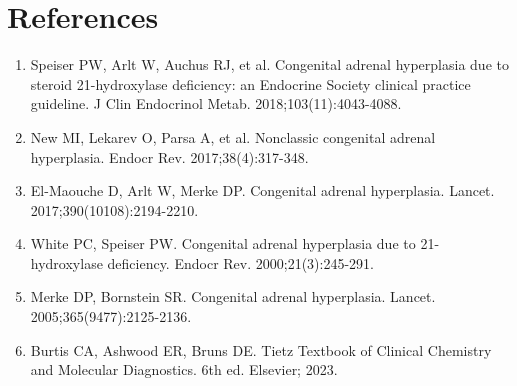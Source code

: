 \section*{References}
\begin{enumerate}
  \item Speiser PW, Arlt W, Auchus RJ, et al. Congenital adrenal hyperplasia due to steroid 21-hydroxylase deficiency: an Endocrine Society clinical practice guideline. J Clin Endocrinol Metab. 2018;103(11):4043-4088.
  \item New MI, Lekarev O, Parsa A, et al. Nonclassic congenital adrenal hyperplasia. Endocr Rev. 2017;38(4):317-348.
  \item El-Maouche D, Arlt W, Merke DP. Congenital adrenal hyperplasia. Lancet. 2017;390(10108):2194-2210.
  \item White PC, Speiser PW. Congenital adrenal hyperplasia due to 21-hydroxylase deficiency. Endocr Rev. 2000;21(3):245-291.
  \item Merke DP, Bornstein SR. Congenital adrenal hyperplasia. Lancet. 2005;365(9477):2125-2136.
  \item Burtis CA, Ashwood ER, Bruns DE. Tietz Textbook of Clinical Chemistry and Molecular Diagnostics. 6th ed. Elsevier; 2023.
\end{enumerate}

\clearpage
